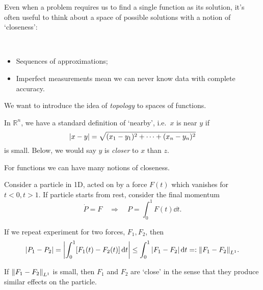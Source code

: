 \documentclass[a4paper,11pt]{article}
\begin{document}
	Even when a problem requires us to find a single function as its solution, it's often useful to think about a space of possible solutions with a notion of 	`closeness':

	\begin{ex}
		\ 
		\begin{itemize}
			\item Sequences of approximations;
			\item Imperfect measurements mean we can never know data with complete accuracy.
		\end{itemize}
	\end{ex}

	We want to introduce the idea of \emph{topology} to spaces of functions.

	In $\mathbb{R}^n$, we have a standard definition of `nearby', i.e.\ $x$ is near $y$ if 
	\[
		\abs{x-y} = \sqrt{(x_1-y_1)^2 + \cdots + (x_n - y_n)^2}
	\]
	is small. Below, we would say $y$ is \emph{closer} to $x$ than $z$.

	\begin{center}
	\end{center}

	For functions we can have many notions of closeness.

	\begin{ex}
		Consider a particle in 1D, acted on by a force $F(t)$ which vanishes for $t<0, t>1$. If particle starts from rest, consider the final momentum
		\[
			\dot{P} = F \quad \Rightarrow \quad P = \int_{0}^{1} F(t) \dd{t}.
		\]
		
		If we repeat experiment for two forces, $F_1, F_2$, then
		\[
			\abs{P_1 - P_2} = \abs{\int_{0}^{1} [F_1 (t) - F_2(t)] \dd{t}} \leq \int_{0}^{1} \abs{F_1 - F_2} \dd{t} =: \norm{F_1 - F_2} _{L^1}.
		\] 
		
		If $\norm{F_1 - F_2}_{L^1}$ is small, then $F_1$ and $F_2$ are `close' in the sense that they produce similar effects on the particle.
	\end{ex}
\end{document}
